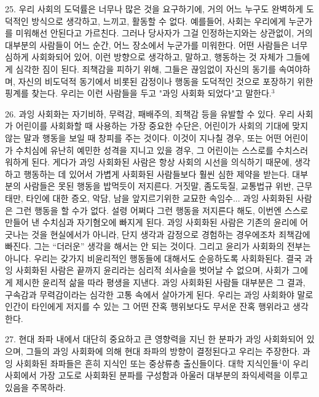 \documentclass[11pt,a4paper]{article}
\begin{document}
\begin{multicols}{2}
25. 우리 사회의 도덕률은 너무나 많은 것을 요구하기에, 거의 어느 누구도 완벽하게 도덕적인 방식으로  생각하고, 느끼고, 활동할 수 없다. 예를들어, 사회는 우리에게 누군가를 미워해선 안된다고 가르친다.  그러나 당사자가 그걸 인정하는지와는 상관없이, 거의 대부분의 사람들이 어느 순간, 어느 장소에서  누군가를 미워한다. 어떤 사람들은 너무 심하게 사회화되어 있어, 이런 방향으로 생각하고, 말하고,  행동하는 것 자체가 그들에게 심각한 짐이 된다. 죄책감을 피하기 위해, 그들은 끊임없이 자신의 동기를  속여야하며, 자신의 비도덕적 동기에서 비롯된 감정이나 행동을 도덕적인 것으로 포장하기 위한 핑계를  찾는다. 우리는 이런 사람들을 두고 "과잉 사회화 되었다"고 말한다.\hyperlink{3}{$^{3}$} 


26. 과잉 사회화는 자기비하, 무력감, 패배주의, 죄책감 등을 유발할 수 있다. 우리 사회가 어린이를  사회화할 때 사용하는 가장 중요한 수단은, 어린이가 사회의 기대에 맞지 않는 말과 행동을 보일 때  창피를 주는 것이다. 이것이 지나칠 경우, 또는 어떤 어린이가 수치심에 유난히 예민한 성격을 지니고  있을 경우, 그 어린이는 스스로를 수치스러워하게 된다. 게다가 과잉 사회화된 사람은 항상 사회의 시선을 의식하기 때문에, 생각하고 행동하는 데 있어서 가볍게 사회화된 사람들보다 훨씬 심한 제약을 받는다.  대부분의 사람들은 못된 행동을 밥먹듯이 저지른다. 거짓말, 좀도둑질, 교통법규 위반, 근무 태만, 타인에  대한 증오, 악담, 남을 앞지르기위한 교묘한 속임수... 과잉 사회화된 사람은 그런 행동을 할 수가 없다.  설령 어쩌다 그런 행동을 저지른다 해도, 이번엔 스스로 만들어 낸 수치심과 자기혐오에 빠지게 된다.  과잉 사회화된 사람은 기존의 윤리에 어긋나는 것을 현실에서가 아니라, 단지 생각과 감정으로 경험하는  경우에조차 죄책감에 빠진다. 그는 “더러운” 생각을 해서는 안 되는 것이다. 그리고 윤리가 사회화의  전부는 아니다. 우리는 갖가지 비윤리적인 행동들에 대해서도 순응하도록 사회화된다. 결국 과잉
사회화된 사람은 끝까지 윤리라는 심리적 쇠사슬을 벗어날 수 없으며, 사회가 그에게 제시한 윤리적 삶을  따라 평생을 지낸다. 과잉 사회화된 사람들 대부분은 그 결과, 구속감과 무력감이라는 심각한 고통 속에서 살아가게 된다. 우리는 과잉 사회화야 말로 인간이 타인에게 저지를 수 있는 그 어떤 잔혹 행위보다도  무서운 잔혹 행위라고 생각한다. 


27. 현대 좌파 내에서 대단히 중요하고 큰 영향력을 지닌 한 분파가 과잉 사회화되어 있으며, 그들의 과잉 사회화에 의해 현대 좌파의 방향이 결정된다고 우리는 주장한다. 과잉 사회화된 좌파들은 흔히 지식인  또는 중상류층 출신들이다. 대학 지식인들\hyperlink{4}{$^{4}$}이 우리 사회에서 가장 고도로 사회화된 분파를 구성함과  아울러 대부분의 좌익세력을 이루고 있음을 주목하라. 



\end{multicols}
\end{document}
